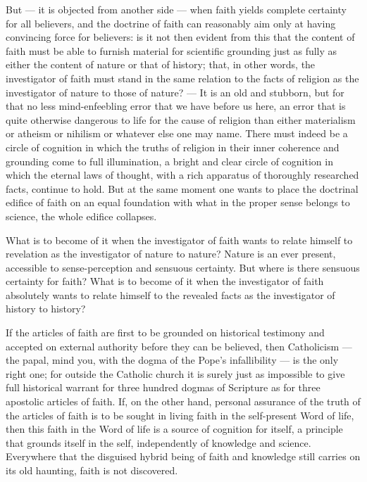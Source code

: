 \documentclass[12pt,a4paper,openany]{book}
\newcommand{\opage}[1]{\marginnote{\footnotesize\textit{[#1]}}}
\begin{document}
But --- it is objected from another side --- when faith yields complete certainty for all believers, and the doctrine of
faith can reasonably aim only at having convincing force for believers: is it not then evident from this that the content of
faith must be able to furnish material for scientific grounding just as fully as either the content of nature or that of
history; that, in other words, the investigator of faith must stand in the same relation to the facts of religion as the
investigator of nature to those of nature? --- It is an
\setcounter{footnote}{0}%
\opage{43}old and stubborn, but for that no less mind-enfeebling error that we have before us here, an error that is quite otherwise
dangerous to life for the cause of religion than either materialism or atheism or nihilism or whatever else one may name.
There must indeed be a circle of cognition in which the truths of religion in their inner coherence and grounding come to full
illumination, a bright and clear circle of cognition in which the eternal laws of thought, with a rich apparatus of thoroughly
researched facts, continue to hold. But at the same moment one wants to place the doctrinal edifice of faith on an equal
foundation with what in the proper sense belongs to science, the whole edifice collapses.

What is to become of it when the investigator of faith wants to relate himself to revelation as the investigator of nature to
nature? Nature is an ever present, accessible to sense-perception and sensuous certainty. But where is there sensuous
certainty for faith? What is to become of it when the investigator of faith absolutely wants to relate himself to the
revealed facts as the investigator of history to history?

If the articles of faith are first to be grounded on historical testimony and accepted on external authority before they can
be believed, then Catholicism --- the papal, mind you, with the dogma of the Pope's infallibility --- is the only right one;
for outside the Catholic church it is surely just as impossible to give full historical warrant for three hundred dogmas of
Scripture as for three apostolic articles of faith. If, on the other hand, personal assurance of the truth of the articles of
faith is to be sought in living faith in the self-present Word of life, then this faith in the Word of life is a source of
cognition for itself, a principle that grounds itself in the self, independently of knowledge and science. Everywhere that the
disguised hybrid being of faith and knowledge still carries on its old haunting, faith is not discovered.
\end{document}
